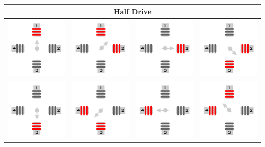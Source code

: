 \begin{table}[H]
\begin{tabular}{|cccc|}
		\hline
		\multicolumn{4}{|c|}{Half Drive} \\
		\hline
		\includegraphics[width = 0.15\columnwidth]{Images/AcionamentoDoHSM/Unipolar/HalfDrive/HalfDriveI.png} & \includegraphics[width = 0.15\columnwidth]{Images/AcionamentoDoHSM/Unipolar/HalfDrive/HalfDriveII.png} & \includegraphics[width = 0.15\columnwidth]{Images/AcionamentoDoHSM/Unipolar/HalfDrive/HalfDriveIII.png} & \includegraphics[width = 0.15\columnwidth]{Images/AcionamentoDoHSM/Unipolar/HalfDrive/HalfDriveIV.png} \\
		\includegraphics[width = 0.15\columnwidth]{Images/AcionamentoDoHSM/Unipolar/HalfDrive/HalfDriveV.png} & \includegraphics[width = 0.15\columnwidth]{Images/AcionamentoDoHSM/Unipolar/HalfDrive/HalfDriveVI.png} & \includegraphics[width = 0.15\columnwidth]{Images/AcionamentoDoHSM/Unipolar/HalfDrive/HalfDriveVII.png} & \includegraphics[width = 0.15\columnwidth]{Images/AcionamentoDoHSM/Unipolar/HalfDrive/HalfDriveVIII.png} \\			
		\hline
	\end{tabular}
\end{table}

